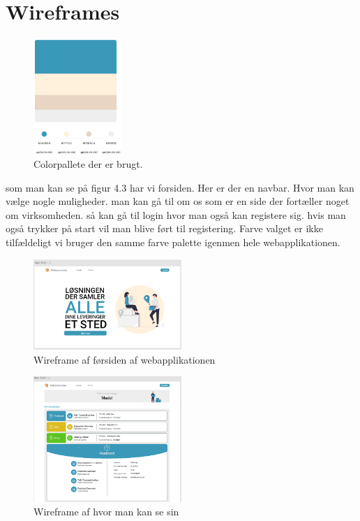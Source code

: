 \section{Wireframes}

\begin{figure} 
    \includegraphics[width=0.3\textwidth]{./Pictures/Colorpallete.png}
    \caption{Colorpallete der er brugt.}
    \label{fig:Colorpallete}
\end{figure}

som man kan se på figur 4.3 har vi forsiden. Her er der en navbar. Hvor man kan vælge nogle muligheder. man
kan gå til om os som er en side der fortæller noget om virksomheden. så kan gå til login hvor man også kan registere sig.
hvis man også trykker på start vil man blive ført til registering. Farve valget er ikke tilfældeligt vi bruger den samme farve
palette igenmen hele webapplikationen. 

\begin{figure} 
    \includegraphics[width=0.5\textwidth]{Pictures/Wireframe1.png}
    \caption{Wireframe af førsiden af webapplikationen}
     \label{fig:Wireframe1}
  \end{figure}

  

  \begin{figure} 
    \includegraphics[width=0.5\textwidth]{Pictures/Wireframe2.png}
    \caption{Wireframe af hvor man kan se sin}
     \label{fig:Wireframe2}
  \end{figure}